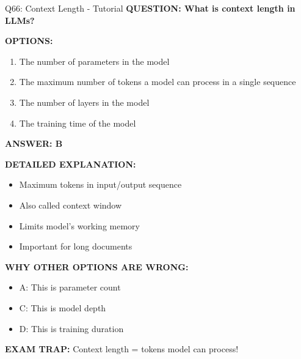 \documentclass[8pt]{beamer}
\begin{document}
	\begin{frame}{Q66: Context Length - Tutorial}
		\fontsize{6.5}{7.5}\selectfont
		\textbf{QUESTION: What is context length in LLMs?}
		
		\vspace{0.1cm}
		\textbf{OPTIONS:}
		\begin{enumerate}
			\item The number of parameters in the model
			\item The maximum number of tokens a model can process in a single sequence
			\item The number of layers in the model
			\item The training time of the model
		\end{enumerate}
		
		\vspace{0.1cm}
		\textcolor{myblue}{\textbf{ANSWER: B}}
		
		\vspace{0.1cm}
		\textbf{DETAILED EXPLANATION:}
		\begin{itemize}
			\item Maximum tokens in input/output sequence
			\item Also called context window
			\item Limits model's working memory
			\item Important for long documents
		\end{itemize}
		
		\vspace{0.1cm}
		\textcolor{myred}{\textbf{WHY OTHER OPTIONS ARE WRONG:}}
		\begin{itemize}
			\item \textcolor{myred}{A:} This is parameter count
			\item \textcolor{myred}{C:} This is model depth
			\item \textcolor{myred}{D:} This is training duration
		\end{itemize}
		
		\textcolor{myred}{\textbf{EXAM TRAP:}} Context length = \textcolor{myblue}{tokens model can process}!
	\end{frame}
	
\end{document}
